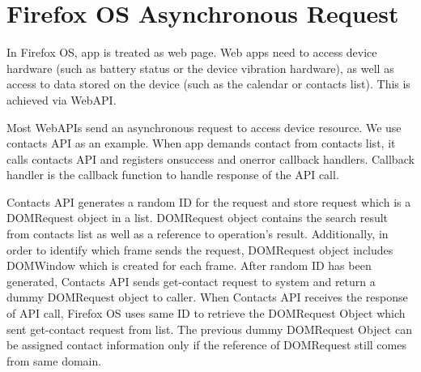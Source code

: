 \documentclass[12pt]{article}
\begin{document}
\section*{Firefox OS Asynchronous Request}
In Firefox OS, app is treated as web page. Web apps need to access device hardware (such as battery status or the device vibration hardware), as well as access to data stored on the device (such as the calendar or contacts list). This is achieved via WebAPI. %

Most WebAPIs send an asynchronous request to access device resource. We use contacts API as an example. When app demands contact from contacts list,  it calls contacts API and registers onsuccess and onerror callback handlers. Callback handler is the callback function to handle response of the API call. %

Contacts API generates a random ID for the request and store request which is a DOMRequest object in a list. DOMRequest object contains the search result from contacts list as well as a reference to operation's result. Additionally, in order to identify which frame sends the request, DOMRequest object includes DOMWindow which is created for each frame. After random ID has been generated, Contacts API sends get-contact request to system and return a dummy DOMRequest object to caller.   %
When Contacts API receives the response of API call, Firefox OS uses same ID to retrieve the DOMRequest Object which sent get-contact request from list. The previous dummy DOMRequest Object can be assigned contact information only if the reference of DOMRequest still comes from same domain.   %
\end{document}
